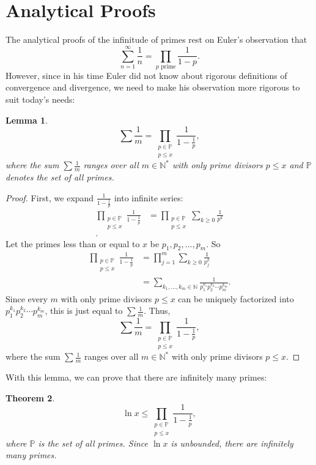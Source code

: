 \documentclass[a4paper]{article}
\newtheorem{theorem}{Theorem}[section]
\newtheorem{lemma}[theorem]{Lemma}
\theoremstyle{definition}
\theoremstyle{remark}
\begin{document}
\section{Analytical Proofs}
The analytical proofs of the infinitude of primes rest on Euler's observation that 
\[
\sum^\infty_{n=1}\frac{1}{n}=\prod_{p\text{ prime}}\frac{1}{1-p}
.
\]
However, since in his time Euler did not know about rigorous definitions of convergence and divergence, we need to make his observation more rigorous to suit today's needs:
\begin{lemma}
  \[
  \sum\frac{1}{m}=\prod\limits_{\substack{p\in\mathbb{P}\\p\le x}}\frac{1}{1-\frac{1}{p}}
  ,
  \]
  where the sum $\sum\frac{1}{m}$ ranges over all $m\in\mathbb{N^*}$ with only prime divisors $p\le x$ and $\mathbb{P}$ denotes the set of all primes.
  \label{lem:EulerProduct}
\end{lemma}
\begin{proof}
  First, we expand $\frac{1}{1-\frac{1}{p}}$ into infinite series:
  \begin{align*}
    \prod\limits_{\substack{p\in\mathbb{P}\\p\le x}}\frac{1}{1-\frac{1}{p}}&=\prod\limits_{\substack{p\in\mathbb{P}\\p\le x}}\sum_{k\ge0}\frac{1}{p^k}\\
    .
  \end{align*}
  Let the primes less than or equal to $x$ be $p_1,p_2,\dots,p_m$. So
  \begin{align*}
    \prod\limits_{\substack{p\in\mathbb{P}\\p\le x}}\frac{1}{1-\frac{1}{p}}&=\prod\limits_{j=1}^m\sum_{k\ge0}\frac{1}{p_j^k}\\
    &=\sum\limits_{k_1,\dots,k_m\in\mathbb{N}}\frac{1}{p_1^{k_1}p_2^{k_2}\cdots p_m^{k_m}}
    .
  \end{align*}
  Since every $m$ with only prime divisors $p\le x$ can be uniquely factorized into $p_1^{k_1}p_2^{k_2}\cdots p_m^{k_m}$, this is just equal to $\sum\frac{1}{m}$. Thus,
  \[
  \sum\frac{1}{m}=\prod\limits_{\substack{p\in\mathbb{P}\\p\le x}}\frac{1}{1-\frac{1}{p}}
  ,
  \]
  where the sum $\sum\frac{1}{m}$ ranges over all $m\in\mathbb{N^*}$ with only prime divisors $p\le x$.
\end{proof}
With this lemma, we can prove that there are infinitely many primes:
\begin{theorem}
  \[
  \ln x\le \prod\limits_{\substack{p\in\mathbb{P}\\p\le x}}\frac{1}{1-\frac{1}{p}}
  ,
  \]
  where $\mathbb{P}$ is the set of all primes. Since $\ln x$ is unbounded, there are infinitely many primes.
  \label{thm:EulerInfinitePrimes}
\end{theorem}
\end{document}
